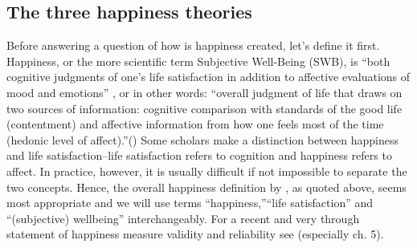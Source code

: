 \documentclass[10pt, letterpaper]{article}
\begin{document}
\begin{spacing}{1.4}


\section{The three happiness theories}

Before answering a question of how is happiness created, let's define it first. 
  Happiness, or the more scientific term Subjective Well-Being (SWB), is ``both cognitive judgments of one's life
satisfaction in addition to affective evaluations of mood and
emotions'' \citep[p. 142]{steel08},  or in other words: ``overall judgment of life that draws on two sources of information:
  cognitive comparison with standards of the good life (contentment) and
  affective information from how one feels most of the time (hedonic
  level of affect).''(\citep[p. 2]{veenhoven08})
 Some scholars make a
  distinction between happiness and life satisfaction--life
  satisfaction refers to cognition and happiness refers to affect. In practice,
  however, it is usually difficult  if not impossible to separate the two
  concepts.  Hence, the overall happiness definition by 
   \citet{veenhoven08}, as quoted above,  seems most appropriate and we will use terms
   ``happiness,''``life satisfaction'' and ``(subjective) wellbeing'' interchangeably.  For a recent and very through statement of
happiness measure validity and reliability see \citet{diener09}
(especially ch. 5). 



\end{spacing}
\end{document}
